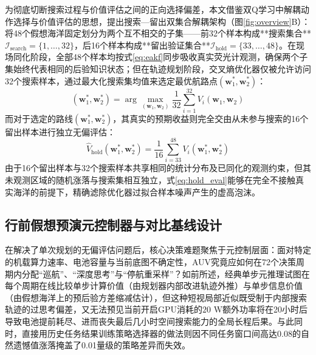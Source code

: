 为彻底切断搜索过程与价值评估之间的正向选择偏差，本文借鉴双Q学习中解耦动作选择与价值评估的思想\cite{vanhasselt2010double}，提出搜索—留出双集合解耦架构（图\ref{fig:overview}B）：将48个假想海洋固定划分为两个互不相交的子集——前32个样本构成**搜索集合**$\mathcal{I}_{\text{search}}=\{1,\dots,32\}$，后16个样本构成**留出验证集合**$\mathcal{I}_{\text{hold}}=\{33,\dots,48\}$。在现场同化阶段，全部48个样本均按式\eqref{eq:eakf}同步吸收真实荧光计观测，确保两个子集始终代表相同的后验知识状态；但在轨迹规划阶段，交叉熵优化器仅被允许访问32个搜索样本，通过最大化搜索集均值来选定最优航路点$(\mathbf{w}_1^*, \mathbf{w}_2^*)$：
\begin{equation}
  (\mathbf{w}_1^*, \mathbf{w}_2^*) = \arg\max_{(\mathbf{w}_1, \mathbf{w}_2)} \frac{1}{32}\sum_{i=1}^{32} V_i(\mathbf{w}_1, \mathbf{w}_2)
  \label{eq:cem_search}
\end{equation}
而对于选定的路线$(\mathbf{w}_1^*, \mathbf{w}_2^*)$，其真实的预期收益则完全交由从未参与搜索的16个留出样本进行独立无偏评估：
\begin{equation}
  \hat{V}_{\text{hold}}(\mathbf{w}_1^*, \mathbf{w}_2^*) = \frac{1}{16}\sum_{i=33}^{48} V_i(\mathbf{w}_1^*, \mathbf{w}_2^*)
  \label{eq:hold_eval}
\end{equation}
由于16个留出样本与32个搜索样本共享相同的统计分布及已同化的观测约束，但其未观测区域的随机涨落与搜索集相互独立，式\eqref{eq:hold_eval}能够在完全不接触真实海洋的前提下，精确滤除优化器过拟合样本噪声产生的虚高泡沫。

\subsection{行前假想预演元控制器与对比基线设计}

在解决了单次规划的无偏评估问题后，核心决策难题聚焦于元控制层面：面对特定的机载算力速率、电池容量与当前底图不确定性，AUV究竟应如何在72个决策周期内分配“巡航”、“深度思考”与“停航重采样”？如前所述，经典单步元推理\cite{russell1991right, lin2015metareasoning}试图在每个周期在线比较单步计算价值（由规划器内部改进轨迹外推）与单步信息价值（由假想海洋上的预后验方差缩减估计），但这种短视局部近似既受制于内部搜索轨迹的过思考偏差，又无法预见当前开启GPU消耗的$20\text{ W}$额外功率将在20小时后导致电池提前耗尽、进而丧失最后几小时空间搜索能力的全局长程后果。与此同时，直接用历史任务结果训练策略选择器的做法则因不同任务窗口间高达0.08的自然遗憾值涨落掩盖了0.01量级的策略差异而失效。

